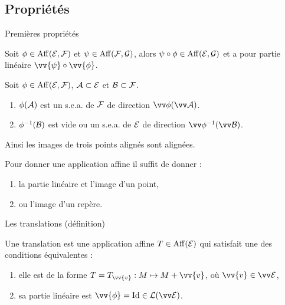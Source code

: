 \documentclass{m53beamer}
\begin{document}
\subsection{Propriétés}
  \begin{frame}{Premières propriétés}
    \begin{proposition}
      Soit $\phi\in\operatorname{Aff}(\mathcal{E},\mathcal{F})$ et $\psi\in\operatorname{Aff}(\mathcal{F},\mathcal{G})$, alors $\psi\circ\phi\in\operatorname{Aff}(\mathcal{E},\mathcal{G})$ et a pour partie linéaire $\vv{\psi}\circ\vv{\phi}$.
    \end{proposition}\pause
    \begin{proposition}
      Soit $\phi\in\operatorname{Aff}(\mathcal{E},\mathcal{F})$, $\mathcal{A} \subset \mathcal{E}$ et $\mathcal{B} \subset \mathcal{F}$.
      \begin{enumerate}
        \item $\phi(\mathcal{A})$ est un s.e.a. de $\mathcal{F}$ de direction $\vv\phi(\ev{A})$.
        \item $\phi^{-1}(\mathcal{B})$ est vide ou un s.e.a. de $\mathcal{E}$ de direction $\vv\phi^{-1}(\ev{B})$.
      \end{enumerate}
      Ainsi les images de trois points alignés sont alignées.
    \end{proposition}\pause
    \begin{proposition}
      Pour donner une application affine il suffit de donner :
      \begin{enumerate}[<+(1)->]
        \item la partie linéaire et l'image d'un point,
        \item ou l'image d'un repère.
      \end{enumerate}
    \end{proposition}
  \end{frame}
  \begin{frame}{Les translations (définition)}
    \begin{defprop}
      Une \alert{translation} est  une application affine $T \in \operatorname{Aff}(\mathcal{E})$ qui satisfait une des conditions équivalentes :
      \begin{enumerate}[<+(1)->]
        \item elle est de la forme $T=T_{\vv{v}}:M \mapsto M+\vv{v}$, où $\vv{v} \in \ev{E}$,
        \item sa partie linéaire est $\vv{\phi}=\id \in \lin(\ev{E})$.
      \end{enumerate}
    \end{defprop}
  \end{frame}
\end{document}
